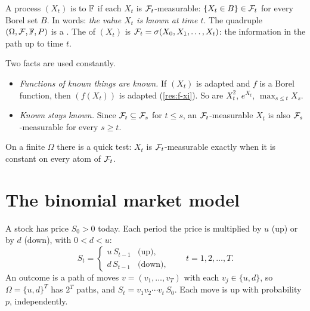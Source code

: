 \begin{definition}
\label{def:adapted}
A process $(X_t)$ is  to $\mathbb F$ if each $X_t$ is $\mathcal F_t$-measurable: $\{X_t\in B\}\in\mathcal F_t$ for every Borel set $B$. In words: \emph{the value $X_t$ is known at time $t$}. The quadruple $(\Omega,\mathcal F,\mathbb F,P)$ is a . The  of $(X_t)$ is $\mathcal F_t=\sigma(X_0,X_1,\dots,X_t)$: the information in the path up to time $t$.
\end{definition}

Two facts are used constantly.
\begin{itemize}
  \item \emph{Functions of known things are known.} If $(X_t)$ is adapted and $f$ is a Borel function, then $(f(X_t))$ is adapted (\cref{res:f-xi}). So are $X_t^2$, $e^{X_t}$, $\max_{s\le t}X_s$.
  \item \emph{Known stays known.} Since $\mathcal F_t\subseteq\mathcal F_s$ for $t\le s$, an $\mathcal F_t$-measurable $X_t$ is also $\mathcal F_s$-measurable for every $s\ge t$.
\end{itemize}

On a finite $\Omega$ there is a quick test: $X_t$ is $\mathcal F_t$-measurable exactly when it is constant on every atom of $\mathcal F_t$.

\section{The binomial market model}
\label{sec:binomial-model}

\begin{setup}
A stock has price $S_0>0$ today. Each period the price is multiplied by $u$ (up) or by $d$ (down), with $0<d<u$:
\[
  S_t=\begin{cases}u\,S_{t-1}&\text{(up)},\\ d\,S_{t-1}&\text{(down)},\end{cases}\qquad t=1,2,\dots,T.
\]
An outcome is a path of moves $v=(v_1,\dots,v_T)$ with each $v_j\in\{u,d\}$, so $\Omega=\{u,d\}^T$ has $2^T$ paths, and $S_t=v_1v_2\cdots v_t\,S_0$. Each move is up with probability $p$, independently.
\end{setup}

